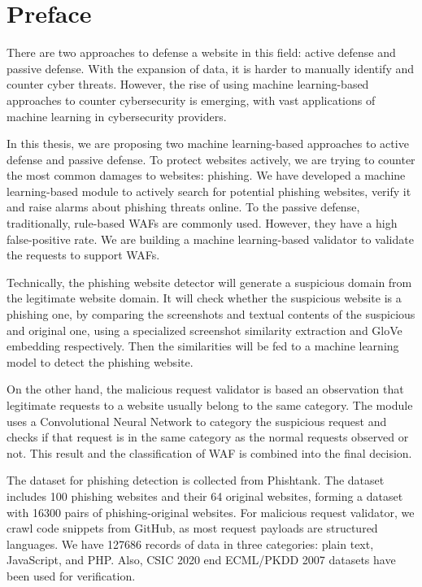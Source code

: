 \chapter*{Preface}
\thispagestyle{fancy}
\label{preface}
\hspace*{5cm}

There are two approaches to defense a website in this field: active defense and passive defense. With the expansion of data, it is harder to manually identify and counter cyber threats. However, the rise of using machine learning-based approaches to counter cybersecurity is emerging, with vast applications of machine learning in cybersecurity providers.

In this thesis, we are proposing two machine learning-based approaches to active defense and passive defense. To protect websites actively, we are trying to counter the most common damages to websites: phishing. We have developed a machine learning-based module to actively search for potential phishing websites, verify it and raise alarms about phishing threats online. To the passive defense, traditionally, rule-based WAFs are commonly used. However, they have a high false-positive rate. We are building a machine learning-based validator to validate the requests to support WAFs.

Technically, the phishing website detector will generate a suspicious domain from the legitimate website domain. It will check whether the suspicious website is a phishing one, by comparing the screenshots and textual contents of the suspicious and original one, using a specialized screenshot similarity extraction and GloVe embedding respectively. Then the similarities will be fed to a machine learning model to detect the phishing website.

On the other hand, the malicious request validator is based an observation that legitimate requests to a website usually belong to the same category. The module uses a Convolutional Neural Network to category the suspicious request and checks if that request is in the same category as the normal requests observed or not. This result and the classification of WAF is combined into the final decision.

The dataset for phishing detection is collected from Phishtank. The dataset includes 100 phishing websites and their 64 original websites, forming a dataset with 16300 pairs of phishing-original websites. For malicious request validator, we crawl code snippets from GitHub, as most request payloads are structured languages. We have 127686 records of data in three categories: plain text, JavaScript, and PHP. Also, CSIC 2020 end ECML/PKDD 2007 datasets have been used for verification.

